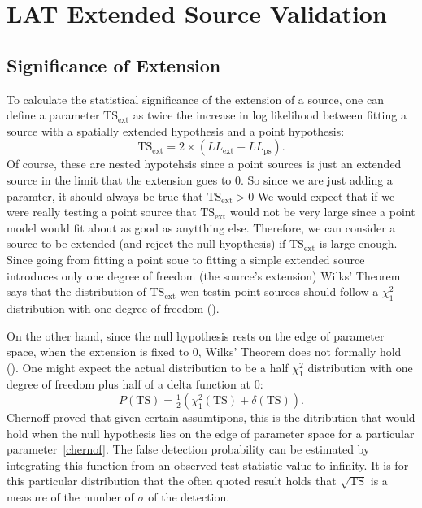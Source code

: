\documentclass[preprint]{aastex}
\newcommand{\tsext}{{\ensuremath{\text{TS}_\text{ext}}}\xspace}
\newcommand{\ts}{\text{TS}\xspace}
\begin{document}
\section{LAT Extended Source Validation}

\subsection{Significance of Extension}

To calculate the statistical significance of the extension of a source,
one can define a parameter $\tsext$ as twice the increase in log
likelihood between fitting a source with a spatially extended hypothesis
and a point hypothesis:
\begin{equation}
  \tsext=2\times(LL_\text{ext}-LL_\text{ps}).
\end{equation}
Of course, these are nested hypotehsis since a point sources is just an
extended source in the limit that the extension goes to 0. So since we
are just adding a paramter, it should always be true that $\tsext > 0$
We would expect that if we were really testing a point source that
\tsext would not be very large since a point model would fit about
as good as anytthing else. Therefore, we can consider a source to be
extended (and reject the null hyopthesis) if \tsext is large enough.
Since going from fitting a point soue to fitting a simple extended
source introduces only one degree of freedom (the source's extension)
Wilks' Theorem says that the distribution of $\tsext$ wen testin
point sources should follow a $\chi^2_1$ distribution with one degree
of freedom (\cite{wilks_theorem}).

On the other hand, since the null hypothesis rests on the edge of
parameter space, when the extension is fixed to 0, Wilks' Theorem does
not formally hold (\cite{warn_wilks_theorem}).  One might
expect the actual distribution to be a half $\chi^2_1$ distribution with
one degree of freedom plus half of a delta function at 0:
\begin{equation}
  P(\ts)=\tfrac{1}{2}(\chi^2_1(\ts)+\delta(\ts)).
\end{equation}
Chernoff proved that given certain assumtipons, this is
the ditribution that would hold when the null hypothesis
lies on the edge of parameter space for a particular parameter~\ref{chernof}.
The false detection probability can be estimated by integrating this function 
from an observed test statistic value to infinity. It is for this
particular distribution that the often quoted result holds that
$\sqrt{\ts}$ is a measure of the number of $\sigma$ of the detection.
\end{document}
